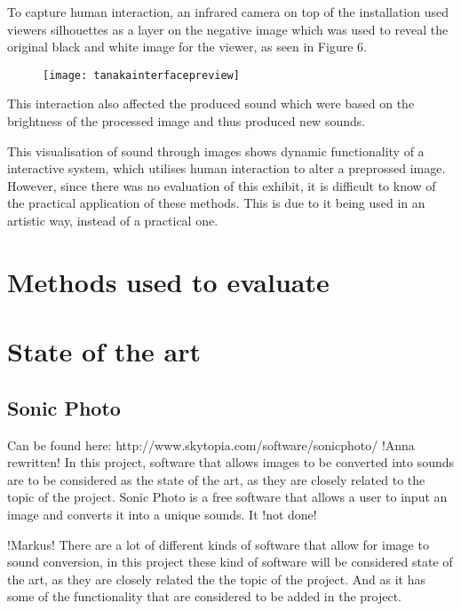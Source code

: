 
To capture human interaction, an infrared camera on top of the installation used viewers silhouettes as a layer on the negative image which was used to reveal the original black and white image for the viewer, as seen in Figure 6.

\begin{figure}[!h]
\centering
\texttt{[image: tanakainterfacepreview]}
\caption{\label{fig:tanakainterfacepreview}\cite{Tanaka2012}}
\end{figure}


This interaction also affected the produced sound which were based on the brightness of the processed image and thus produced new sounds. 

This visualisation of sound through images shows dynamic functionality of a interactive system, which utilises human interaction to alter a preprossed image. However, since there was no evaluation of this exhibit, it is difficult to know of the practical application of these methods. This is due to it being used in an artistic way, instead of a practical one.   
 

\section{Methods used to evaluate}\label{sub:methodsusedtoevaluate}


\section{State of the art}\label{sec:stateart}

\subsection{Sonic Photo}\label{sub:sonic}
Can be found here: http://www.skytopia.com/software/sonicphoto/
!Anna rewritten!
In this project, software that allows images to be converted into sounds are to be considered as the state of the art, as they are closely related to the topic of the project. 
Sonic Photo is a free software that allows a user to input an image and converts it into a unique sounds. It !not done!




!Markus!
There are a lot of different kinds of software that allow for image to sound conversion, in this project these kind of software will be considered state of the art, as they are closely related the the topic of the project. And as it has some of the functionality that are considered to be added in the project.


